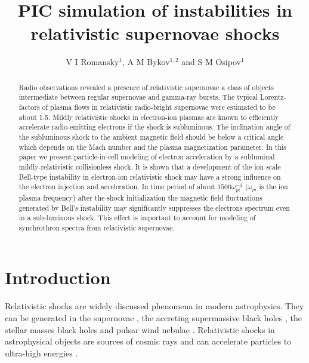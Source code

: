 \documentclass[a4paper]{jpconf}
\begin{document}
	\title{PIC simulation of instabilities in relativistic supernovae shocks}
	
	\author{V I Romansky$^{1}$, A M Bykov$^{1,2}$ and S M Osipov$^{1}$}
	
	\address{$^1$ Ioffe Institute, 26 Politekhnicheskaya st., St. Petersburg 194021, Russia}
	\address{$^2$ Peter the Great St. Petersburg Polytechnic University, 29 Politekhnicheskaya st., St. Petersburg 195251, Russia}
	
	
	\begin{abstract}
                 Radio observations revealed a presence of relativistic supernovae a class of objects intermediate between regular supernovae and gamma-ray bursts. The typical Lorentz-factors of plasma flows in relativistic radio-bright supernovae were estimated to be about 1.5. Mildly relativistic shocks in electron-ion plasmas are known to efficiently accelerate radio-emitting electrons if the shock is subluminous. The inclination angle of the subluminous shock to the ambient magnetic field should be below a critical angle which depends on the Mach number and the plasma magnetization parameter.  In this paper we present particle-in-cell modeling of electron acceleration by a subluminal mildly-relativistic collisionless shock. It is shown that  a development of the ion scale Bell-type instability in electron-ion relativistic shock may have a strong influence on the electron injection and acceleration. In time period of about $1500 \omega_{pi}^{-1}$  ($\omega_{pi}$ is the ion plasma frequency) after the shock initialization the  magnetic field fluctuations  generated by Bell's instability may significantly suppresses the electrons spectrum even in a sub-luminous shock. This effect is important to account for modeling of synchrothron spectra from relativistic supernovae.
	\end{abstract}
	
	\section{Introduction}
	Relativistic shocks are widely discussed phenomena in modern astrophysics. They can be generated in the supernovae \cite{2010Natur.463..513S,2007ApJ...667..351W}, the accreting supermassive black holes \cite{1984RvMP...56..255B}, the stellar masses black holes \cite{2019MmSAI..90...57M,1999PhR...314..575P,2014LNP...876.....R} and pulsar wind nebulae \cite{2019MNRAS.488.5690O,2017SSRv..207..235B,2017JPlPh..83e6301K,2019ApJ...876L...8B}. Relativistic shocks in astrophysical objects are sources of cosmic rays \cite{2012SSRv..173..309B,2015SSRv..191..519S,2017SSRv..207..319P} and can accelerate particles to ultra-high energies \cite{2009JCAP...11..009L}.
	
\end{document}

